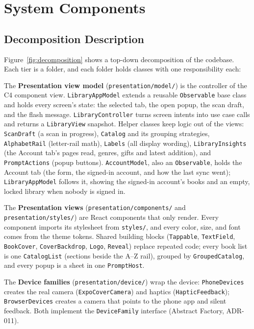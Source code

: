 \documentclass[12pt]{article}
\begin{document}
\section{System Components}
\label{sec:components}

\subsection{Decomposition Description}

Figure~\ref{fig:decomposition} shows a top-down decomposition of the codebase. Each tier is a folder, and each folder holds classes with one responsibility each:

The \textbf{Presentation view model} (\texttt{presentation/model/}) is the controller of the C4 component view. \texttt{LibraryAppModel} extends a reusable \texttt{Observable} base class and holds every screen's state: the selected tab, the open popup, the scan draft, and the flash message. \texttt{LibraryController} turns screen intents into use case calls and returns a \texttt{LibraryView} snapshot. Helper classes keep logic out of the views: \texttt{ScanDraft} (a scan in progress), \texttt{Catalog} and its grouping strategies, \texttt{AlphabetRail} (letter-rail math), \texttt{Labels} (all display wording), \texttt{LibraryInsights} (the Account tab's pages read, genres, gifts and latest addition), and \texttt{PromptActions} (popup buttons). \texttt{AccountModel}, also an \texttt{Observable}, holds the Account tab (the form, the signed-in account, and how the last sync went); \texttt{LibraryAppModel} follows it, showing the signed-in account's books and an empty, locked library when nobody is signed in.

The \textbf{Presentation views} (\texttt{presentation/components/} and \texttt{presentation/styles/}) are React components that only render. Every component imports its stylesheet from \texttt{styles/}, and every color, size, and font comes from the theme tokens. Shared building blocks (\texttt{Tappable}, \texttt{TextField}, \texttt{BookCover}, \texttt{CoverBackdrop}, \texttt{Logo}, \texttt{Reveal}) replace repeated code; every book list is one \texttt{CatalogList} (sections beside the A--Z rail), grouped by \texttt{GroupedCatalog}, and every popup is a sheet in one \texttt{PromptHost}.

The \textbf{Device families} (\texttt{presentation/device/}) wrap the device: \texttt{PhoneDevices} creates the real camera (\texttt{ExpoCoverCamera}) and haptics (\texttt{HapticFeedback}); \texttt{BrowserDevices} creates a camera that points to the phone app and silent feedback. Both implement the \texttt{DeviceFamily} interface (Abstract Factory, ADR-011).
\end{document}
